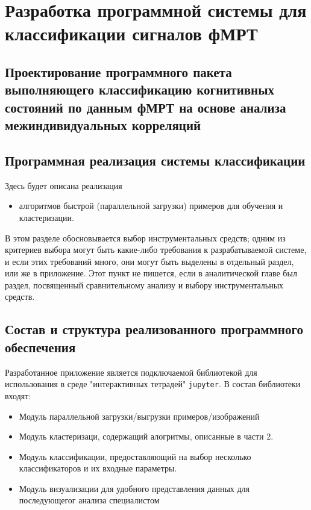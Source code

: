 \chapter{Разработка программной системы для классификации сигналов фМРТ}


\section{Проектирование программного пакета выполняющего классификацию когнитивных состояний по данным фМРТ на основе анализа межиндивидуальных корреляций}


\section{Программная реализация системы классификации}
\begin{annotation}
	Здесь будет описана реализация
	\begin{itemize}
		\item алгоритмов быстрой (параллельной загрузки) примеров для обучения и кластеризации.		
	\end{itemize}

\end{annotation}
В этом разделе обосновывается выбор инструментальных средств; одним из критериев выбора могут быть какие-либо требования к разрабатываемой системе, и если этих требований много, они могут быть выделены в отдельный раздел, или же в приложение. Этот пункт не пишется, если в аналитической главе был раздел, посвященный сравнительному анализу и выбору инструментальных средств.




\section{Состав и структура реализованного программного обеспечения}
\begin{annotation}
	Разработанное приложение является подключаемой библиотекой для использования в среде "интерактивных тетрадей" \texttt{jupyter}. В состав библиотеки входят:
	\begin{itemize}
		\item Модуль параллельной загрузки/выгрузки примеров/изображений
		\item Модуль кластеризаци, содержащий алогритмы, описанные в части 2.
		\item Модуль классификации, предоставляющий на выбор несколько классификаторов и их входные параметры.
		\item Модуль визуализации для удобного представления данных для последующегог анализа специалистом		
	\end{itemize}
\end{annotation}

